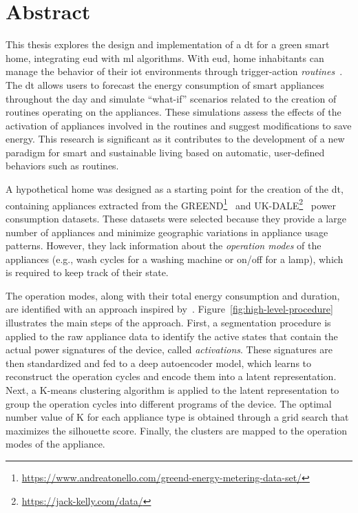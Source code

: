 \section*{Abstract}

This thesis explores the design and implementation of a \acrfull*{dt} for a green smart home, integrating \acrlong*{eud} with \acrlong*{ml} algorithms. With \acrlong*{eud}, home inhabitants can manage the behavior of their \acrlong*{iot} environments through trigger-action \textit{routines}~\parencite{barricelliEnduserDevelopmentEnduser2019}. The \acrshort*{dt} allows users to forecast the energy consumption of smart appliances throughout the day and simulate ``what-if'' scenarios related to the creation of routines operating on the appliances. These simulations assess the effects of the activation of appliances involved in the routines and suggest modifications to save energy. This research is significant as it contributes to the development of a new paradigm for smart and sustainable living based on automatic, user-defined behaviors such as routines.

A hypothetical home was designed as a starting point for the creation of the \acrshort*{dt}, containing appliances extracted from the GREEND\footnote{\url{https://www.andreatonello.com/greend-energy-metering-data-set/}}~\parencite{monacchiGREENDEnergyConsumption2014} and UK-DALE\footnote{\url{https://jack-kelly.com/data/}}~\parencite{kellyUKDALEDatasetDomestic2015} power consumption datasets. These datasets were selected because they provide a large number of appliances and minimize geographic variations in appliance usage patterns. However, they lack information about the \textit{operation modes} of the appliances (e.g., wash cycles for a washing machine or on/off for a lamp), which is required to keep track of their state.

The operation modes, along with their total energy consumption and duration, are identified with an approach inspired by~\cite{castangiaClusteringApplianceOperation2023}. Figure~\ref{fig:high-level-procedure} illustrates the main steps of the approach. First, a segmentation procedure is applied to the raw appliance data to identify the active states that contain the actual power signatures of the device, called \textit{activations}. These signatures are then standardized and fed to a deep autoencoder model, which learns to reconstruct the operation cycles and encode them into a latent representation. Next, a K-means clustering algorithm is applied to the latent representation to group the operation cycles into different programs of the device. The optimal number value of K for each appliance type is obtained through a grid search that maximizes the silhouette score. Finally, the clusters are mapped to the operation modes of the appliance.

